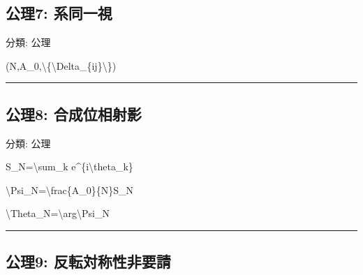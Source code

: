\documentclass[
  a4paper,
]{ltjsarticle}
\newenvironment{Shaded}{}{}
\newcommand{\NormalTok}[1]{#1}
\begin{document}
\subsection{公理7:
系同一視}\label{ux516cux74067-ux7cfbux540cux4e00ux8996}

分類: 公理

\begin{Shaded}
\begin{Highlighting}[]
\NormalTok{(N,A\_0,\textbackslash{}\{\textbackslash{}Delta\_\{ij\}\textbackslash{}\})}
\end{Highlighting}
\end{Shaded}

\begin{center}\rule{0.5\linewidth}{0.5pt}\end{center}

\subsection{公理8:
合成位相射影}\label{ux516cux74068-ux5408ux6210ux4f4dux76f8ux5c04ux5f71}

分類: 公理

\begin{Shaded}
\begin{Highlighting}[]
\NormalTok{S\_N=\textbackslash{}sum\_k e\^{}\{i\textbackslash{}theta\_k\}}
\end{Highlighting}
\end{Shaded}

\begin{Shaded}
\begin{Highlighting}[]
\NormalTok{\textbackslash{}Psi\_N=\textbackslash{}frac\{A\_0\}\{N\}S\_N}
\end{Highlighting}
\end{Shaded}

\begin{Shaded}
\begin{Highlighting}[]
\NormalTok{\textbackslash{}Theta\_N=\textbackslash{}arg\textbackslash{}Psi\_N}
\end{Highlighting}
\end{Shaded}

\begin{center}\rule{0.5\linewidth}{0.5pt}\end{center}

\subsection{公理9:
反転対称性非要請}\label{ux516cux74069-ux53cdux8ee2ux5bfeux79f0ux6027ux975eux8981ux8acb}
\end{document}
